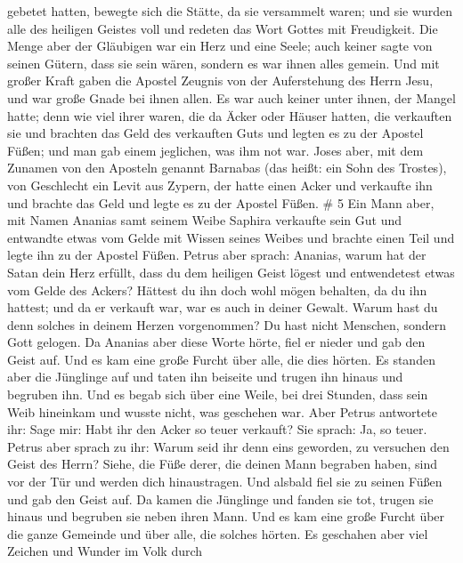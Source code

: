 gebetet hatten, bewegte sich die Stätte, da sie versammelt waren; und
sie wurden alle des heiligen Geistes voll und redeten das Wort Gottes
mit Freudigkeit.  Die Menge aber der Gläubigen war ein Herz
und eine Seele; auch keiner sagte von seinen Gütern, dass sie sein
wären, sondern es war ihnen alles gemein.  Und mit großer
Kraft gaben die Apostel Zeugnis von der Auferstehung des Herrn Jesu, und
war große Gnade bei ihnen allen.  Es war auch keiner unter
ihnen, der Mangel hatte; denn wie viel ihrer waren, die da Äcker oder
Häuser hatten, die verkauften sie und brachten das Geld des verkauften
Guts  und legten es zu der Apostel Füßen; und man gab einem
jeglichen, was ihm not war.  Joses aber, mit dem Zunamen
von den Aposteln genannt Barnabas (das heißt: ein Sohn des Trostes), von
Geschlecht ein Levit aus Zypern,  der hatte einen Acker und
verkaufte ihn und brachte das Geld und legte es zu der Apostel Füßen. \#
5  Ein Mann aber, mit Namen Ananias samt seinem Weibe
Saphira verkaufte sein Gut  und entwandte etwas vom Gelde
mit Wissen seines Weibes und brachte einen Teil und legte ihn zu der
Apostel Füßen.  Petrus aber sprach: Ananias, warum hat der
Satan dein Herz erfüllt, dass du dem heiligen Geist lögest und
entwendetest etwas vom Gelde des Ackers?  Hättest du ihn
doch wohl mögen behalten, da du ihn hattest; und da er verkauft war, war
es auch in deiner Gewalt. Warum hast du denn solches in deinem Herzen
vorgenommen? Du hast nicht Menschen, sondern Gott gelogen. 
Da Ananias aber diese Worte hörte, fiel er nieder und gab den Geist auf.
Und es kam eine große Furcht über alle, die dies hörten.  Es
standen aber die Jünglinge auf und taten ihn beiseite und trugen ihn
hinaus und begruben ihn.  Und es begab sich über eine Weile,
bei drei Stunden, dass sein Weib hineinkam und wusste nicht, was
geschehen war.  Aber Petrus antwortete ihr: Sage mir: Habt
ihr den Acker so teuer verkauft? Sie sprach: Ja, so teuer. 
Petrus aber sprach zu ihr: Warum seid ihr denn eins geworden, zu
versuchen den Geist des Herrn? Siehe, die Füße derer, die deinen Mann
begraben haben, sind vor der Tür und werden dich hinaustragen.
 Und alsbald fiel sie zu seinen Füßen und gab den Geist
auf. Da kamen die Jünglinge und fanden sie tot, trugen sie hinaus und
begruben sie neben ihren Mann.  Und es kam eine große
Furcht über die ganze Gemeinde und über alle, die solches hörten.
 Es geschahen aber viel Zeichen und Wunder im Volk durch
